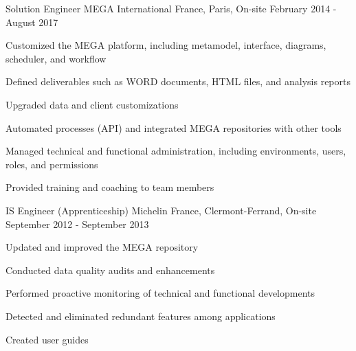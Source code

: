 \begin{cventries}
  \cventry
    {Solution Engineer}
    {MEGA International}
    {France, Paris, On-site}
    {February 2014 - August 2017}
    {
      \begin{cvitems}
        \item {Customized the MEGA platform, including metamodel, interface, diagrams, scheduler, and workflow}
        \item {Defined deliverables such as WORD documents, HTML files, and analysis reports}
        \item {Upgraded data and client customizations}
        \item {Automated processes (API) and integrated MEGA repositories with other tools}
        \item {Managed technical and functional administration, including environments, users, roles, and permissions}
        \item {Provided training and coaching to team members}
      \end{cvitems}
    }

  \cventry
    {IS Engineer (Apprenticeship)}
    {Michelin}
    {France, Clermont-Ferrand, On-site}
    {September 2012 - September 2013}
    {
      \begin{cvitems}
        \item {Updated and improved the MEGA repository}
        \item {Conducted data quality audits and enhancements}
        \item {Performed proactive monitoring of technical and functional developments}
        \item {Detected and eliminated redundant features among applications}
        \item {Created user guides}
      \end{cvitems}
    }

\end{cventries}
